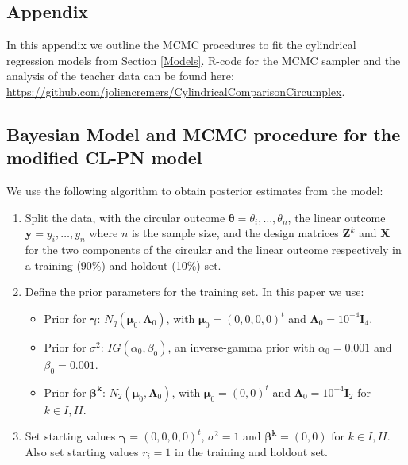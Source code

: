 \documentclass[11pt,]{article}
\begin{document}
\begin{appendices}
\section{Appendix}\label{Appendix}

In this appendix we outline the MCMC procedures to fit the cylindrical regression models from Section \ref{Models}. R-code for the MCMC sampler and the analysis of the teacher data can be found here: \url{https://github.com/joliencremers/CylindricalComparisonCircumplex}.

\subsection{Bayesian Model and MCMC procedure for the modified CL-PN model}\label{A1}

We use the following algorithm to obtain posterior estimates from the model:

\begin{enumerate}

\item Split the data, with the circular outcome $\boldsymbol{\theta} = \theta_i, \dots, \theta_n$, the linear outcome $\boldsymbol{y} = y_i, \dots, y_n$ where $n$ is the sample size, and the design matrices $\boldsymbol{Z}^k$ and $\boldsymbol{X}$ for the two components of the circular and the linear outcome respectively in a training (90\%) and holdout (10\%) set.

\item Define the prior parameters for the training set. In this paper we use:

\begin{itemize}
\item Prior for $\boldsymbol{\gamma}$: $N_q(\boldsymbol{\mu}_{0}, \boldsymbol{\Lambda}_{0})$, with  $\boldsymbol{\mu}_{0} = (0,0,0,0)^t$ and  $\boldsymbol{\Lambda}_{0} = 10^{-4}\boldsymbol{I}_4$.
\item Prior for $\sigma^2$: $IG(\alpha_{0}, \beta_{0})$, an inverse-gamma prior with $\alpha_{0} = 0.001$ and  $\beta_{0} = 0.001$.
\item Prior for $\boldsymbol{\beta^{k}}$: $N_2(\boldsymbol{\mu}_{0}, \boldsymbol{\Lambda}_{0})$, with $\boldsymbol{\mu}_{0} = (0,0)^t$ and  $\boldsymbol{\Lambda}_{0} = 10^{-4}\boldsymbol{I}_2$ for $k \in I,II$.
\end{itemize}

\item Set starting values $\boldsymbol{\gamma} = (0,0,0,0)^t$, $\sigma^2 = 1$ and $\boldsymbol{\beta^{k}} = (0,0)$ for $k \in I,II$. Also set starting values $r_i = 1$ in the training and holdout set. 


\end{enumerate}
\end{appendices}
\end{document}
